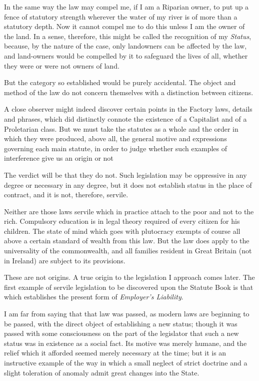 \documentclass{book}
\begin{document}
In the same way the law may compel me, if I am a Riparian owner, to put up a fence of statutory strength wherever the water of my river is of more than a statutory depth. Now it cannot compel me to do this unless I am the owner of the land. In a sense, therefore, this might be called the recognition of my \emph{Status}, because, by the nature of the case, only landowners can be affected by the law, and land-owners would be compelled by it to safeguard the lives of all, whether they were or were not owners of land.

But the category so established would be purely accidental. The object and method of the law do not concern themselves with a distinction between citizens.

A close observer might indeed discover certain points in the Factory laws, details and phrases, which did distinctly connote the existence of a Capitalist and of a Proletarian class. But we must take the statutes as a whole and the order in which they were produced, above all, the general motive and expressions governing each main statute, in order to judge whether such examples of interference give us an origin or not

The verdict will be that they do not. Such legislation may be oppressive in any degree or necessary in any degree, but it does not establish status in the place of contract, and it is not, therefore, servile.

Neither are those laws servile which in practice attach to the poor and not to the rich. Compulsory education is in legal theory required of every citizen for his children. The state of mind which goes with plutocracy exempts of course all above a certain standard of wealth from this law. But the law does apply to the universality of the commonwealth, and all families resident in Great Britain (not in Ireland) are subject to its provisions.

These are not origins. A true origin to the legislation I approach comes later. The first example of servile legislation to be discovered upon the Statute Book is that which establishes the present form of \emph{Employer’s Liability}.

I am far from saying that that law was passed, as modern laws are beginning to be passed, with the direct object of establishing a new status; though it was passed with some consciousness on the part of the legislator that such a new status was in existence as a social fact. Its motive was merely humane, and the relief which it afforded seemed merely necessary at the time; but it is an instructive example of the way in which a small neglect of strict doctrine and a slight toleration of anomaly admit great changes into the State.
\end{document}
